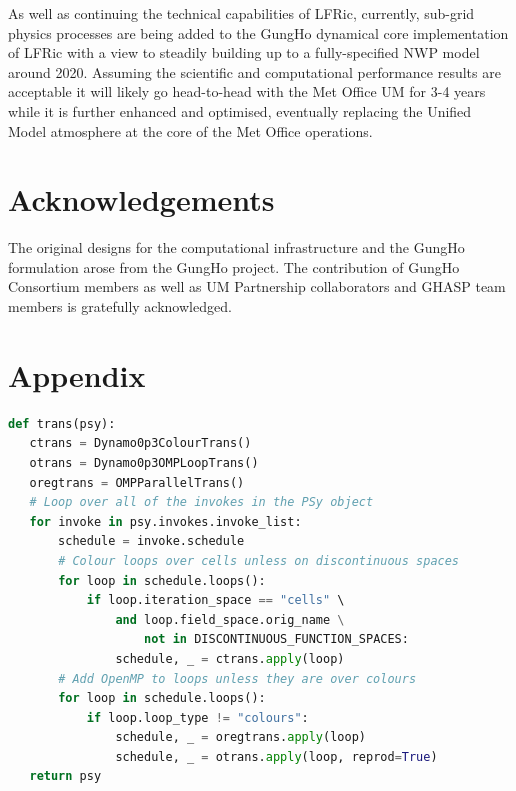 \documentclass[review,times]{elsarticle}
\begin{document}
As well as continuing the technical capabilities of LFRic, currently,
sub-grid physics processes are being added to the GungHo dynamical
core implementation of LFRic with a view to steadily building up to a
fully-specified NWP model around 2020. Assuming the scientific and
computational performance results are acceptable it will likely go
head-to-head with the Met Office UM for 3-4 years while it is further
enhanced and optimised, eventually replacing the Unified Model
atmosphere at the core of the Met Office operations.

\section*{Acknowledgements}
The original designs for the computational infrastructure and the GungHo
formulation arose from the GungHo project. The contribution of GungHo
Consortium members as well as UM Partnership collaborators and GHASP team
members is gratefully acknowledged.


\section*{\label{app1}Appendix}

\begin{lstlisting}[language=python,caption={Python script for applying
transformations to a PSyclone schedule.},label={lst:omp.py}]
def trans(psy):
   ctrans = Dynamo0p3ColourTrans()
   otrans = Dynamo0p3OMPLoopTrans()
   oregtrans = OMPParallelTrans()
   # Loop over all of the invokes in the PSy object
   for invoke in psy.invokes.invoke_list:
       schedule = invoke.schedule
       # Colour loops over cells unless on discontinuous spaces
       for loop in schedule.loops():
           if loop.iteration_space == "cells" \
               and loop.field_space.orig_name \
                   not in DISCONTINUOUS_FUNCTION_SPACES:
               schedule, _ = ctrans.apply(loop)
       # Add OpenMP to loops unless they are over colours
       for loop in schedule.loops():
           if loop.loop_type != "colours":
               schedule, _ = oregtrans.apply(loop)
               schedule, _ = otrans.apply(loop, reprod=True)
   return psy
\end{lstlisting}

\newpage


\end{document}
